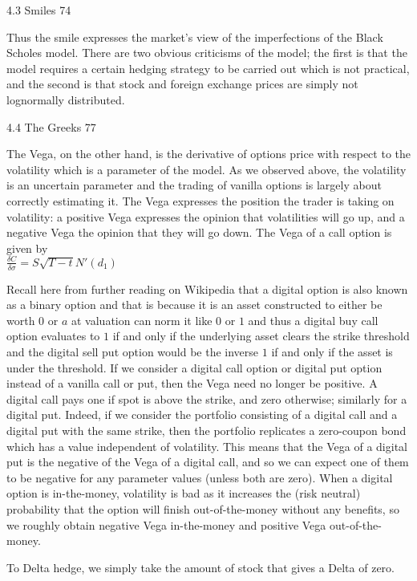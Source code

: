 4.3 Smiles 74

Thus the smile expresses the market's view of the imperfections of the Black Scholes model. There are two obvious criticisms of the model; the first is that the model requires a certain hedging strategy to be carried out which is not practical, and the second is that stock and foreign exchange prices are simply not lognormally distributed.

4.4 The Greeks 77

The Vega, on the other hand, is the derivative of options price with respect to the volatility which is a parameter of the model. As we observed above, the volatility is an uncertain parameter and the trading of vanilla options is largely about correctly estimating it. The Vega expresses the position the trader is taking on volatility: a positive Vega expresses the opinion that volatilities will go up, and a negative Vega the opinion that they will go down. The Vega of a call option is given by \\

$\frac{\delta C}{\delta \sigma} = S \sqrt{T-t} N'(d_1)$

Recall here from further reading on Wikipedia that a digital option is also known as a binary option and that is because it is an asset constructed to either be worth $0$ or $a$ at valuation can norm it like $0$ or $1$ and thus a digital buy call option evaluates to $1$ if and only if the underlying asset clears the strike threshold and the digital sell put option would be the inverse $1$ if and only if the asset is under the threshold. If we consider a digital call option or digital put option instead of a vanilla call or put, then the Vega need no longer be positive. A digital call pays one if spot is above the strike, and zero otherwise; similarly for a digital put. Indeed, if we consider the portfolio consisting of a digital call and a digital put with the same strike, then the portfolio replicates a zero-coupon bond which has a value independent of volatility. This means that the Vega of a digital put is the negative of the Vega of a digital call, and so we can expect one of them to be negative for any parameter values (unless both are zero). When a digital option is in-the-money, volatility is bad as it increases the (risk neutral) probability that the option will finish out-of-the-money without any benefits, so we roughly obtain negative Vega in-the-money and positive Vega out-of-the-money.

To Delta hedge, we simply take the amount of stock that gives a Delta of zero.


